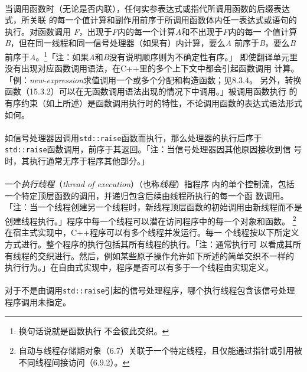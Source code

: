 \paragraph{}
当调用函数时（无论是否内联），任何实参表达式或指代所调用函数的后缀表达式，所关联
的每一个值计算和副作用前序于所调用函数体内任一表达式或语句的执行。对函数调用
\textit{F}，出现于\textit{F}内的每一个计算\textit{A}和不出现于\textit{F}内的每一
个值计算\textit{B}，但在同一线程和同一信号处理器（如果有）内计算，要么\textit{A}
前序于\textit{B}，要么\textit{B}前序于\textit{A}。\footnote{换句话说就是函数执行
不会彼此交织。}「注：如果\textit{A}和\textit{B}没有说明顺序则为不确定性有序。」
即使翻译单元里没有出现对应函数调用语法，在C++里的多个上下文中都会引起函数调用
计算。「例：\textit{new-expression}求值调用一个或多个分配和构造函数；见8.3.4。
另外，转换函数（15.3.2）可以在无函数调用语法出现的情况下中调用。」被调用函数执行
的有序约束（如上所述）是函数调用执行时的特性，不论调用函数的表达式语法形式如何。

\paragraph{}
如信号处理器因调用\texttt{std::raise}函数而执行，那么处理器的执行后序于
\texttt{std::raise}函数调用，前序于其返回。「注：当信号处理器因其他原因接收到信
号时，其执行通常无序于程序其他部分。」

\paragraph{}
一个\textit{执行线程}（\textit{thread of execution}）（也称\textit{线程}）指程序
内的单个控制流，包括一个特定顶层函数的调用，并递归包含后续由线程所执行的每一个函
数调用。「注：当一个线程创建另一个线程时，新线程顶层函数的初始调用由新线程而不是
创建线程执行。」程序中每一个线程可以潜在访问程序中的每一个对象和函数。
\footnote{自动与线程存储期对象（6.7）关联于一个特定线程，且仅能通过指针或引用被
不同线程间接访问（6.9.2）。} 在宿主式实现中，C++程序可以有多个线程并发运行。每一
个线程按以下所定义方式进行。整个程序的执行包括其所有线程的执行。「注：通常执行可
以看成其所有线程的交织进行。然后，例如某些原子操作允许如下所述的简单交织不一样的
执行行为。」在自由式实现中，程序是否可以有多于一个线程由实现定义。

\paragraph{}
对于不是由调用\texttt{std::raise}引起的信号处理程序，哪个执行线程包含该信号处理
程序调用未指定。

